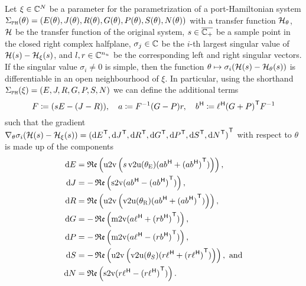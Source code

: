 
\begin{theorem}\label{lem:inner-sobmor-gradient}
    Let $\xi \in \mathbb{C}^{N}$ be a parameter for the parametrization of a port-Hamiltonian system $\Sigma_{\textnormal{\scshape ph}}(\theta) = (E(\theta), J(\theta), R(\theta), G(\theta), P(\theta), S(\theta), N(\theta))$ with a transfer function $\mathcal{H}_\theta$, $\mathcal{H}$ be the transfer function of the original system, $s \in \overline{\mathbb{C}_+}$ be a sample point in the closed right complex halfplane, $\sigma_j \in \mathbb{C}$ be the $i$-th largest singular value of $\mathcal{H}(s) - \mathcal{H}_\xi(s)$, and $l, r \in \mathbb{C}^{n_u}$ be the corresponding left and right singular vectors.
    If the singular value $\sigma_i \neq 0$ is simple, then the function $\theta \mapsto \sigma_i(\mathcal{H}(s) - \mathcal{H}_\theta(s))$ is differentiable in an open neighbourhood of $\xi$.
    In particular, using the shorthand $\Sigma_{\textnormal{\scshape ph}}(\xi) = (E, J, R, G, P, S, N)$ we can define the additional terms
    \begin{equation}\label{eq:inner-sobmor-gradient-helpers}
        F \coloneqq (s E - (J - R)),\quad a \coloneqq F^{-1} (G - P) r,\quad b^{\mkern1mu \mathsf{H}} \coloneqq \ell^{\mkern1mu \mathsf{H}} {(G + P)}^{\mkern1mu \mathsf{T}} F^{-1}
    \end{equation}
    such that the gradient $\nabla_\theta \sigma_i(\mathcal{H}(s) - \mathcal{H}_\xi(s)) = {({\mathop{}\!\mathrm{d} E}^{\mkern1mu \mathsf{T}}, {\mathop{}\!\mathrm{d} J}^{\mkern1mu \mathsf{T}}, {\mathop{}\!\mathrm{d} R}^{\mkern1mu \mathsf{T}}, {\mathop{}\!\mathrm{d} G}^{\mkern1mu \mathsf{T}}, {\mathop{}\!\mathrm{d} P}^{\mkern1mu \mathsf{T}}, {\mathop{}\!\mathrm{d} S}^{\mkern1mu \mathsf{T}}, {\mathop{}\!\mathrm{d} N}^{\mkern1mu \mathsf{T}})}^{\mkern1mu \mathsf{T}}$ with respect to $\theta$ is made up of the components
    \begin{equation}\label{eq:inner-sobmor-gradient-components}
        \begin{aligned}
            \dif E &= \re{\uppervec\left( s \vecupper(\theta_\msc{E}) (a b\herm + {(a b\herm)}\trans) \right)}, \\
            \dif J &= - \re{\strictvec(a b\herm - {(a b\herm)}\trans)}, \\
            \dif R &= \re{\uppervec\left( \vecupper(\theta_\msc{R}) (a b\herm + {(a b\herm)}\trans) \right)}, \\
            \dif G &= - \re{\matvec(a \ell\herm + {(r b\herm)}\trans)}, \\
            \dif P &= - \re{\matvec(a \ell\herm - {(r b\herm)}\trans)}, \\
            \dif S &= - \re{\uppervec\left( \vecupper(\theta_S) (r \ell\herm + {(r \ell\herm)}\trans) \right)}, \text{ and} \\
            \dif N &= \re{\strictvec(r \ell\herm - {(r \ell\herm)}\trans)}.
        \end{aligned}
    \end{equation}

\end{theorem}


